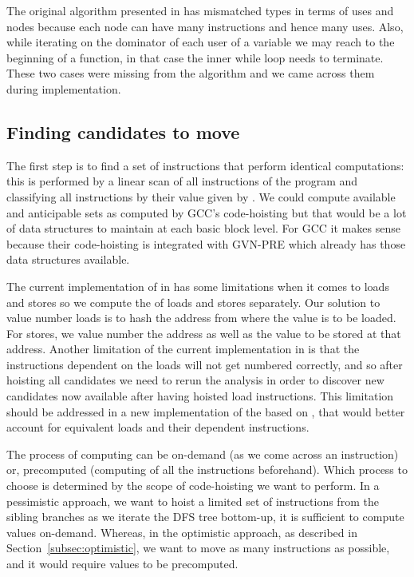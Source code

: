 \documentclass[acmlarge,review]{acmart}\settopmatter{printfolios=true}
\begin{document}
The original algorithm presented in \cite{das2012} has mismatched types in terms
of uses and nodes because each node can have many instructions and hence many
uses. Also, while iterating on the dominator of each user of a variable we may
reach to the beginning of a function, in that case the inner while loop needs to
terminate. These two cases were missing from the algorithm and we came across
them during implementation.

\subsection{Finding candidates to move}
\label{subsec:finding-candidates}
The first step is to find a set of instructions that perform identical
computations: this is performed by a linear scan of all instructions of the
program and classifying all instructions by their value given by \GVN{}. We
could compute available and anticipable sets as computed by GCC's code-hoisting
but that would be a lot of data structures to maintain at each basic block
level. For GCC it makes sense because their code-hoisting is integrated with
GVN-PRE which already has those data structures available.

The current implementation of \GVN{} in \LLVM{} has some limitations when it
comes to loads and stores so we compute the \GVN{} of loads and stores
separately.  Our solution to value number loads is to hash the address from
where the value is to be loaded. For stores, we value number the address as well
as the value to be stored at that address. Another limitation of the current
\GVN{} implementation in \LLVM{} is that the instructions dependent on the loads
will not get numbered correctly, and so after hoisting all candidates we need to
rerun the \GVN{} analysis in order to discover new candidates now available
after having hoisted load instructions.  This limitation should be addressed in
a new implementation of the \GVN{} based on \MemorySSA{}, that would better
account for equivalent loads and their dependent instructions.

The process of computing \GVN{} can be on-demand (as we come across an
instruction) or, precomputed (computing \GVN{} of all the instructions
beforehand). Which process to choose is determined by the scope of code-hoisting
we want to perform. In a pessimistic approach, we want to hoist a limited set of
instructions from the sibling branches as we iterate the DFS tree bottom-up, it
is sufficient to compute \GVN{} values on-demand. Whereas, in the optimistic
approach, as described in Section~\ref{subsec:optimistic}, we want to move as
many instructions as possible, and it would require \GVN{} values to be
precomputed.
\end{document}
